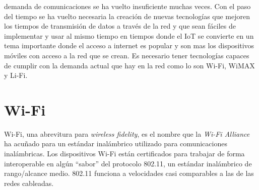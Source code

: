 \documentclass[10pt,journal,compsoc]{IEEEtran}
\begin{document}




% 
% 
% 
% 
 demanda de comunicaciones se ha vuelto insuficiente muchas veces. Con el paso del tiempo se ha vuelto necesaria la creación de nuevas tecnologías que mejoren los tiempos de transmisión de datos a través de la red y que sean fáciles de implementar y usar al mismo tiempo en tiempos donde el IoT se convierte en un tema importante donde el acceso a internet es popular y son mas los dispositivos móviles con acceso a la red que se crean. Es necesario tener tecnologías capaces de cumplir con la demanda actual que hay en la red como lo son Wi-Fi, WiMAX y Li-Fi.


\section{Wi-Fi}
Wi-Fi, una abrevitura para \emph{wireless fidelity}, es el nombre que la \emph{Wi-Fi Alliance} ha acuñado para un estándar inalámbrico utilizado para comunicaciones inalámbricas. Los dispositivos Wi-Fi están certificados para trabajar de forma interoperable en algún ``sabor'' del protocolo 802.11, un estándar inalámbrico de rango/alcance medio. 802.11 funciona a velocidades casi comparables a las de las redes cableadas.
\end{document}
